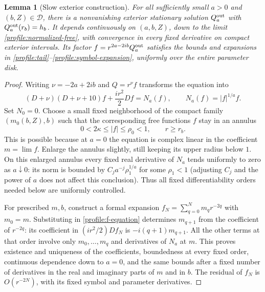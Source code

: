 \documentclass[11pt]{article}
\numberwithin{equation}{section}
\newtheorem{lemma}[theorem]{Lemma}
\theoremstyle{definition}
\theoremstyle{remark}
\begin{document}
\begin{lemma}[Slow exterior construction]\label{profile:exterior}
For all sufficiently small $a>0$ and $(b,Z)\in\mathcal D$, there is a
nonvanishing exterior stationary solution $Q^{\rm out}_a$ with
$Q^{\rm out}_a(r_b)=h_b$.  It depends continuously on $(a,b,Z)$, down to
the limit \eqref{profile:normalized-free}, with convergence in every
fixed derivative on compact exterior intervals.  Its factor
$f=r^{2a-2ib}Q^{\rm out}_a$ satisfies the bounds and expansions in
\eqref{profile:tail}--\eqref{profile:symbol-expansion}, uniformly over
the entire parameter disk.
\end{lemma}

\begin{proof}
Writing $\nu=-2a+2ib$ and $Q=r^\nu f$ transforms the equation into
\begin{equation}\label{profile:f-equation}
 (D+\nu)(D+\nu+10)f+\frac{ir^2}{2}Df=N_a(f),
       \qquad N_a(f)=|f|^{1/a}f.
\end{equation}
Set $N_0=0$.  Choose a small fixed neighborhood of the compact family
$(m_0(b,Z),b)$ such that the corresponding free functions $f$ stay in
an annulus
\begin{equation}\label{profile:annulus}
 0<2\kappa\le|f|\le\rho_0<1,\qquad r\ge r_b.
\end{equation}
This is possible because at $a=0$ the equation is complex linear in the
coefficient $m=\lim f$.  Enlarge the annulus slightly, still keeping its
upper radius below $1$.  On this enlarged annulus every fixed real
derivative of $N_a$ tends uniformly to zero as $a\downarrow0$: its norm
is bounded by $C_j a^{-j}\rho_1^{1/a}$ for some $\rho_1<1$ (adjusting
$C_j$ and the power of $a$ does not affect this conclusion).  Thus all
fixed differentiability orders needed below are uniformly controlled.

For prescribed $m,b$, construct a formal expansion
$f_N=\sum_{q=0}^Nm_qr^{-2q}$ with $m_0=m$.  Substituting in
\eqref{profile:f-equation} determines $m_{q+1}$ from the coefficient of
$r^{-2q}$: its coefficient in $(ir^2/2)Df_N$ is $-i(q+1)m_{q+1}$.
All the other terms at that order involve only $m_0,\ldots,m_q$ and
derivatives of $N_a$ at $m$.  This proves existence and uniqueness of
the coefficients, boundedness at every fixed order, continuous
dependence down to $a=0$, and the same bounds after a fixed number of
derivatives in the real and imaginary parts of $m$ and in $b$.
The residual of $f_N$ is $O(r^{-2N})$, with its fixed symbol and
parameter derivatives.


\end{proof}
\end{document}

